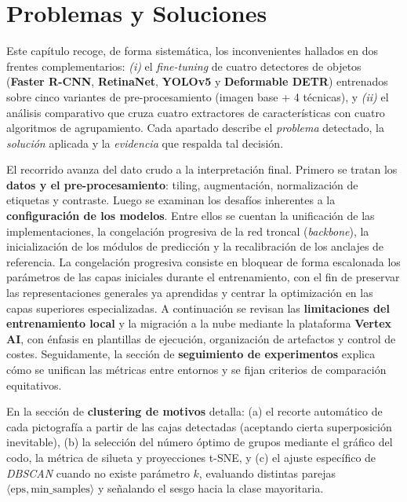 \chapter{Problemas y Soluciones}\label{ch:problemas_y_soluciones}
\noindent
Este capítulo recoge, de forma sistemática, los inconvenientes hallados en dos frentes complementarios:
\emph{(i)} el \emph{fine-tuning} de cuatro detectores de objetos (\textbf{Faster R-CNN}, \textbf{RetinaNet}, \textbf{YOLOv5} y \textbf{Deformable DETR}) entrenados sobre cinco variantes de pre-procesamiento (imagen base + 4 técnicas), y
\emph{(ii)} el análisis comparativo que cruza cuatro extractores de características con cuatro algoritmos de agrupamiento.
Cada apartado describe el \emph{problema} detectado, la \emph{solución} aplicada y la \emph{evidencia} que respalda tal decisión.

El recorrido avanza del dato crudo a la interpretación final.
Primero se tratan los \textbf{datos y el pre-procesamiento}: tiling, augmentación, normalización de etiquetas y contraste.
Luego se examinan los desafíos inherentes a la \textbf{configuración de los modelos}.
Entre ellos se cuentan la unificación de las implementaciones, la congelación progresiva de la red troncal (\emph{backbone}), la inicialización de los módulos de predicción y la recalibración de los anclajes de referencia.
La congelación progresiva consiste en bloquear de forma escalonada los parámetros de las capas iniciales durante el entrenamiento, con el fin de preservar las representaciones generales ya aprendidas y centrar la optimización en las capas superiores especializadas.
A continuación se revisan las \textbf{limitaciones del entrenamiento local} y la migración a la nube mediante la plataforma \textbf{Vertex AI}, con énfasis en plantillas de ejecución, organización de artefactos y control de costes.
Seguidamente, la sección de \textbf{seguimiento de experimentos} explica cómo se unifican las métricas entre entornos y se fijan criterios de comparación equitativos.

En la sección de \textbf{clustering de motivos} detalla:
(a) el recorte automático de cada pictografía a partir de las cajas detectadas (aceptando cierta superposición inevitable),
(b) la selección del número óptimo de grupos mediante el gráfico del codo, la métrica de silueta y proyecciones t-SNE,
y (c) el ajuste específico de \textit{DBSCAN} cuando no existe parámetro \(k\), evaluando distintas parejas \(\langle\text{eps},\text{min\_samples}\rangle\) y señalando el sesgo hacia la clase mayoritaria.

